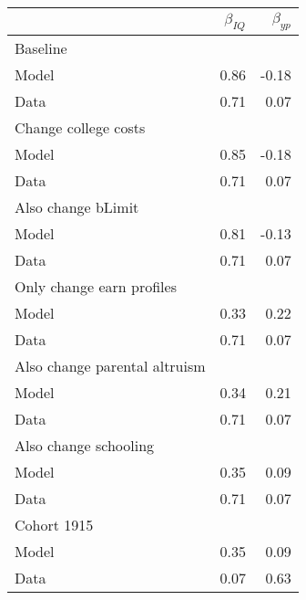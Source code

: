 \begin{tabular}{lrr}
\hline
  & $\beta_{IQ}$  & $\beta_{yp}$  \\
\hline
Baseline &   &   \\
Model & 0.86  & -0.18  \\
Data & 0.71  & 0.07  \\
Change college costs &   &   \\
Model & 0.85  & -0.18  \\
Data & 0.71  & 0.07  \\
Also change bLimit &   &   \\
Model & 0.81  & -0.13  \\
Data & 0.71  & 0.07  \\
Only change earn profiles &   &   \\
Model & 0.33  & 0.22  \\
Data & 0.71  & 0.07  \\
Also change parental altruism &   &   \\
Model & 0.34  & 0.21  \\
Data & 0.71  & 0.07  \\
Also change schooling &   &   \\
Model & 0.35  & 0.09  \\
Data & 0.71  & 0.07  \\
Cohort 1915 &   &   \\
Model & 0.35  & 0.09  \\
Data & 0.07  & 0.63  \\
\hline
\end{tabular}%
